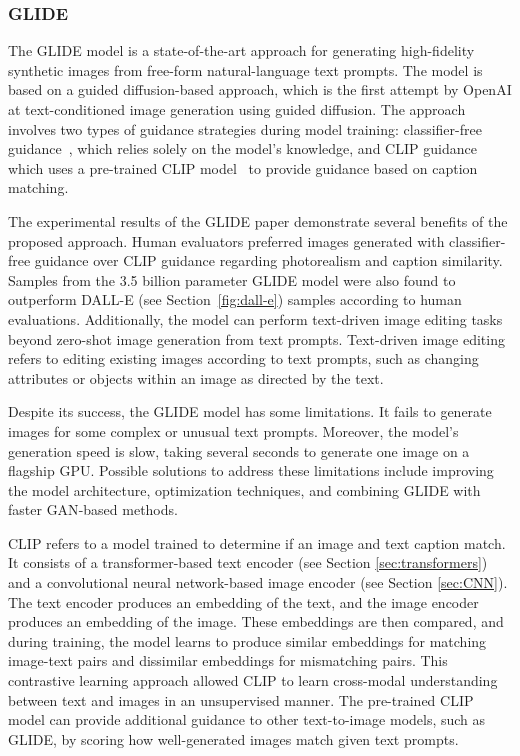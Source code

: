 \subsubsection{GLIDE} \label{sec:glide}

The \acf{GLIDE} model is a state-of-the-art approach for generating high-fidelity synthetic images from free-form natural-language text prompts. The model is based on a guided diffusion-based approach, which is the first attempt by OpenAI at text-conditioned image generation using guided diffusion. The approach involves two types of guidance strategies during model training: classifier-free guidance~\cite{ho_classifier-free_2022}, which relies solely on the model's knowledge, and \ac{CLIP} guidance which uses a pre-trained \ac{CLIP} model~\cite{radford_learning_2021} to provide guidance based on caption matching.

The experimental results of the \ac{GLIDE} paper demonstrate several benefits of the proposed approach. Human evaluators preferred images generated with classifier-free guidance over \ac{CLIP} guidance regarding photorealism and caption similarity. Samples from the 3.5 billion parameter \ac{GLIDE} model were also found to outperform DALL-E (see Section~\ref{fig:dall-e}) samples according to human evaluations. Additionally, the model can perform text-driven image editing tasks beyond zero-shot image generation from text prompts. Text-driven image editing refers to editing existing images according to text prompts, such as changing attributes or objects within an image as directed by the text.

Despite its success, the \ac{GLIDE} model has some limitations. It fails to generate images for some complex or unusual text prompts. Moreover, the model's generation speed is slow, taking several seconds to generate one image on a flagship \ac{GPU}. Possible solutions to address these limitations include improving the model architecture, optimization techniques, and combining \ac{GLIDE} with faster \ac{GAN}-based methods.

\Acf{CLIP} refers to a model trained to determine if an image and text caption match. It consists of a transformer-based text encoder (see Section \ref{sec:transformers}) and a convolutional neural network-based image encoder (see Section \ref{sec:CNN}). The text encoder produces an embedding of the text, and the image encoder produces an embedding of the image. These embeddings are then compared, and during training, the model learns to produce similar embeddings for matching image-text pairs and dissimilar embeddings for mismatching pairs. This contrastive learning approach allowed CLIP to learn cross-modal understanding between text and images in an unsupervised manner. The pre-trained CLIP model can provide additional guidance to other text-to-image models, such as \ac{GLIDE}, by scoring how well-generated images match given text prompts.